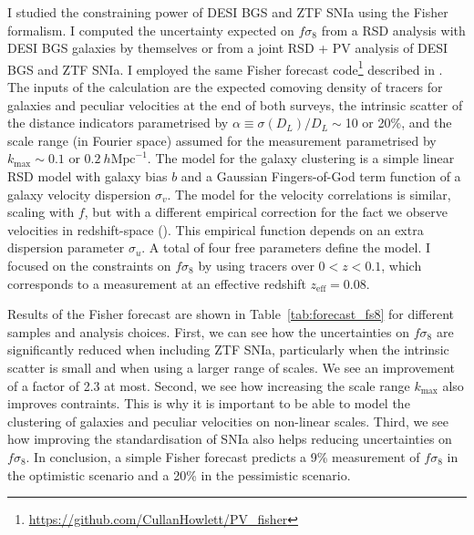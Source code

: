 I studied the constraining power of DESI BGS and ZTF SNIa using the Fisher formalism.
I computed the uncertainty expected on $f\sigma_8$ from a RSD analysis with DESI BGS galaxies by themselves  
or from a joint RSD + PV analysis of DESI BGS and ZTF SNIa. 
I employed the same Fisher forecast code\footnote{\url{https://github.com/CullanHowlett/PV_fisher}} 
described in \cite{howlettMeasuringGrowthRate2017}. 
The inputs of the calculation are the expected comoving density of tracers for galaxies and peculiar velocities
at the end of both surveys, 
the intrinsic scatter of the distance indicators parametrised by $\alpha \equiv \sigma(D_L)/D_L \sim $10 or 20\%, 
and the scale range (in Fourier space) assumed for the measurement parametrised by $k_\text{max} \sim 0.1$ or $0.2~h\text{Mpc}^{-1}$. 
The model for the galaxy clustering is a simple linear RSD model with galaxy bias $b$ and 
a Gaussian Fingers-of-God term function of a galaxy velocity dispersion $\sigma_v$. 
The model for the velocity correlations is similar, scaling with $f$, but with a different 
empirical correction for the fact we observe velocities in redshift-space  (\cite{kodaArePeculiarVelocity2014}).
This empirical function depends on an extra dispersion parameter $\sigma_u$. 
A total of four free parameters define the model. I focused on the constraints on $f\sigma_8$ 
by using tracers over $0< z < 0.1$, which corresponds to a measurement at an effective 
redshift $z_\text{eff} = 0.08$. 

Results of the Fisher forecast are shown in Table~\ref{tab:forecast_fs8}
for different samples and analysis choices. 
First, we can see how the uncertainties on $f\sigma_8$ are 
significantly reduced when including ZTF SNIa, particularly when 
the intrinsic scatter is small and when using a larger range of scales. 
We see an improvement of a factor of 2.3 at most.  
Second, we see how increasing the scale range $k_\text{max}$ also improves contraints. 
This is why it is important to be able to model the clustering of galaxies and 
peculiar velocities on non-linear scales. 
Third, we see how improving the standardisation of SNIa also helps 
reducing uncertainties on $f\sigma_8$. 
In conclusion, a simple Fisher forecast predicts a 9\% measurement of $f\sigma_8$ 
in the optimistic scenario and a 20\% in the pessimistic scenario. 

